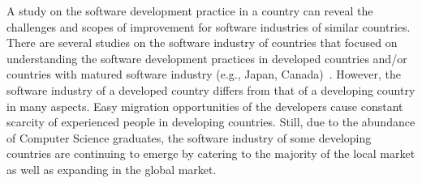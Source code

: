  A study on the software development practice in a country
can reveal the challenges and scopes of improvement for software industries of similar countries. There are several studies on the software
industry of countries that focused on understanding the software development practices 
in developed countries and/or countries with matured software industry (e.g., Japan, Canada)~\citep{Garousi2013, Garousi2015, Vonken2012, Wang2018}. However, 
the software industry of a developed country differs from that of a developing
country in many aspects. Easy migration opportunities of the developers cause
constant scarcity of experienced people in developing countries. Still, due to
the abundance of Computer Science graduates, the software industry of some
developing countries are continuing to emerge by catering to the majority of the
local market as well as expanding in the global market.


